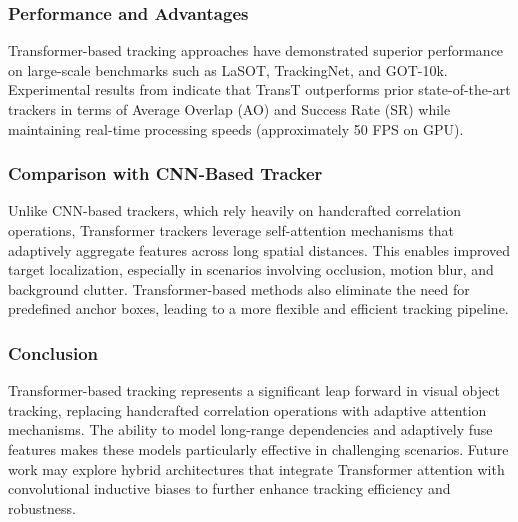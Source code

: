 \subsubsection{Performance and Advantages}
Transformer-based tracking approaches have demonstrated superior performance on large-scale benchmarks such as LaSOT, TrackingNet, and GOT-10k. Experimental results from \cite{chen2021transformer} indicate that TransT outperforms prior state-of-the-art trackers in terms of Average Overlap (AO) and Success Rate (SR) while maintaining real-time processing speeds (approximately 50 FPS on GPU).

\subsubsection{Comparison with CNN-Based Tracker}
Unlike CNN-based trackers, which rely heavily on handcrafted correlation operations, Transformer trackers leverage self-attention mechanisms that adaptively aggregate features across long spatial distances. This enables improved target localization, especially in scenarios involving occlusion, motion blur, and background clutter. Transformer-based methods also eliminate the need for predefined anchor boxes, leading to a more flexible and efficient tracking pipeline.

\subsubsection{Conclusion}
Transformer-based tracking represents a significant leap forward in visual object tracking, replacing handcrafted correlation operations with adaptive attention mechanisms. The ability to model long-range dependencies and adaptively fuse features makes these models particularly effective in challenging scenarios. Future work may explore hybrid architectures that integrate Transformer attention with convolutional inductive biases to further enhance tracking efficiency and robustness.




\endinput